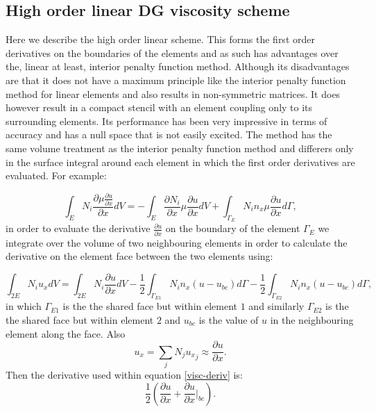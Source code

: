\subsection{High order linear DG viscosity scheme}
Here we describe the high order linear scheme. This forms the first order derivatives
on the boundaries of the elements and as such has advantages over the, linear at least,
interior penalty function method. Although its disadvantages are that it does not have
a maximum principle like the interior penalty function method for linear elements and also
results in non-symmetric matrices. It does however result in a compact stencil with
an element coupling only to its surrounding elements. Its performance has been very impressive
in terms of accuracy and has a null space that is not easily excited.
The method has the same volume treatment as the interior penalty function method
and differers only in the surface integral around each element in which the first order derivatives
are evaluated.
For example:

\begin{equation}
\int_E N_i \frac{\partial \mu    \frac{\partial u}{\partial x}
}{\partial x} dV
=
- \int_E \frac{\partial N_i}{\partial x} \mu \frac{\partial u}{\partial x} dV
+ \int_{\Gamma_E} N_i n_x \mu \frac{\partial u}{\partial x} d\Gamma,
\label{visc-deriv}
\end{equation}
in order to evaluate the derivative $\frac{\partial u}{\partial x}$
on the boundary of the element ${\Gamma_E}$ we integrate over the volume
of two neighbouring elements in order to calculate the derivative on the element
face between the two elements using:


\begin{equation}
\int_{2E} N_i  u_x  dV
=
\int_{2E} N_i  \frac{\partial u}{\partial x} dV
- \frac{1}{2} \int_{\Gamma_{E1}} N_i n_x (u-u_{bc}) d\Gamma
- \frac{1}{2} \int_{\Gamma_{E2}} N_i n_x (u-u_{bc}) d\Gamma,
\end{equation}
in which ${\Gamma_{E1}}$ is the the shared face but within element $1$ and
similarly ${\Gamma_{E2}}$ is the the shared face but within element $2$
and $u_{bc}$ is the value of $u$ in the neighbouring element along the face.
Also
\begin{equation}
u_x =\sum_j N_j {u_x}_j  \approx
 \frac{\partial u}{\partial x} .
\end{equation}
Then the derivative used within equation \ref{visc-deriv} is:
\begin{equation}
\frac{1}{2} (\frac{\partial u}{\partial x}+\frac{\partial u}{\partial x}\vert_{bc} ).
\end{equation}



